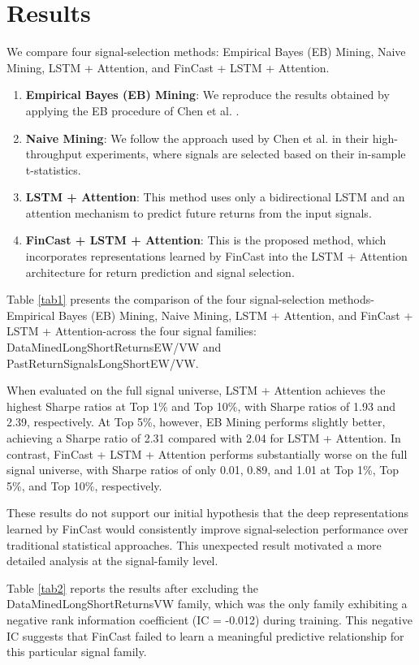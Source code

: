 \documentclass[pdflatex,sn-mathphys-num]{sn-jnl}%
\theoremstyle{thmstyleone}%
\theoremstyle{thmstyletwo}%
\theoremstyle{thmstylethree}%
\begin{document}
\section{Results}\label{sec5}

We compare four signal-selection methods: Empirical Bayes (EB) Mining, Naive Mining, LSTM + Attention, and FinCast + LSTM + Attention.
\begin{enumerate}
\item \textbf{Empirical Bayes (EB) Mining}: We reproduce the results obtained by applying the EB procedure of Chen et al. \cite{chen2025highthroughputassetpricing}.
\item \textbf{Naive Mining}: We follow the approach used by Chen et al. \cite{chen2025highthroughputassetpricing} in their high-throughput experiments, where signals are selected based on their in-sample t-statistics.
\item \textbf{LSTM + Attention}: This method uses only a bidirectional LSTM and an attention mechanism to predict future returns from the input signals.
\item \textbf{FinCast + LSTM + Attention}: This is the proposed method, which incorporates representations learned by FinCast into the LSTM + Attention architecture for return prediction and signal selection.
\end{enumerate}
Table \ref{tab1} presents the comparison of the four signal-selection methods-Empirical Bayes (EB) Mining, Naive Mining, LSTM + Attention, and FinCast + LSTM + Attention-across the four signal families: DataMinedLongShortReturnsEW/VW and PastReturnSignalsLongShortEW/VW.

When evaluated on the full signal universe, LSTM + Attention achieves the highest Sharpe ratios at Top 1\% and Top 10\%, with Sharpe ratios of 1.93 and 2.39, respectively. At Top 5\%, however, EB Mining performs slightly better, achieving a Sharpe ratio of 2.31 compared with 2.04 for LSTM + Attention. In contrast, FinCast + LSTM + Attention performs substantially worse on the full signal universe, with Sharpe ratios of only 0.01, 0.89, and 1.01 at Top 1\%, Top 5\%, and Top 10\%, respectively.

These results do not support our initial hypothesis that the deep representations learned by FinCast would consistently improve signal-selection performance over traditional statistical approaches. This unexpected result motivated a more detailed analysis at the signal-family level.

Table \ref{tab2} reports the results after excluding the DataMinedLongShortReturnsVW family, which was the only family exhibiting a negative rank information coefficient (IC = -0.012) during training. This negative IC suggests that FinCast failed to learn a meaningful predictive relationship for this particular signal family.
\end{document}
